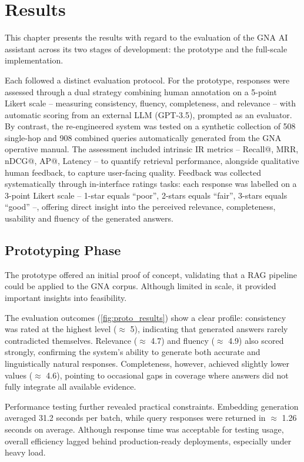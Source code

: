 \chapter{Results}
\label{chap:results}
\begin{spacing}{1.5}

This chapter presents the results with regard to the evaluation of the GNA AI assistant across its two stages of development: the prototype and the full-scale implementation. 

Each followed a distinct evaluation protocol. For the prototype, responses were assessed through a dual strategy combining human annotation on a 5-point Likert scale -- measuring consistency, fluency, completeness, and relevance -- with automatic scoring from an external LLM (GPT-3.5), prompted as an evaluator. By contrast, the re-engineered system was tested on a synthetic collection of 508 single-hop and 908 combined queries automatically generated from the GNA operative manual. The assessment included intrinsic IR metrics -- Recall@, MRR, nDCG@, AP@, Latency --  to quantify retrieval performance, alongside qualitative human feedback, to capture user-facing quality. Feedback was collected systematically through in-interface ratings tasks: each response was labelled on a 3-point Likert scale -- 1-star equals ``poor'', 2-stars equals ``fair'', 3-stars equals ``good'' --, offering direct insight into the perceived relevance, completeness, usability and fluency of the generated answers.


\section{Prototyping Phase}\label{sec:prototype_results}
The prototype offered an initial proof of concept, validating that a RAG pipeline could be applied to the GNA corpus. Although limited in scale, it provided important insights into feasibility.

The evaluation outcomes (\autoref{fig:proto_results}) show a clear profile: consistency was rated at the highest level ($\approx$ 5), indicating that generated answers rarely contradicted themselves. Relevance ($\approx$ 4.7) and fluency ($\approx$ 4.9) also scored strongly, confirming the system’s ability to generate both accurate and linguistically natural responses. Completeness, however, achieved slightly lower values ($\approx$ 4.6), pointing to occasional gaps in coverage where answers did not fully integrate all available evidence.

Performance testing further revealed practical constraints. Embedding generation averaged 31.2 seconds per batch, while query responses were returned in $\approx$ 1.26 seconds on average. Although response time was acceptable for testing usage, overall efficiency lagged behind production-ready deployments, especially under heavy load. 


\end{spacing}
